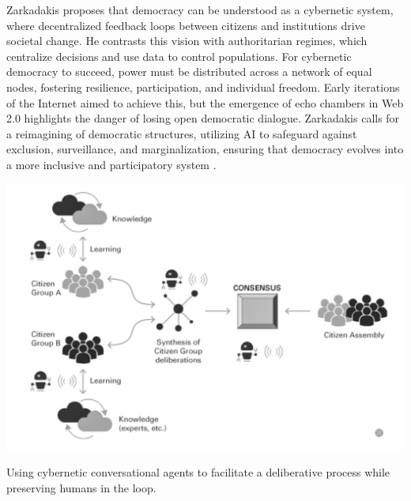 Zarkadakis proposes that democracy can be understood as a cybernetic system, where decentralized feedback loops between citizens and institutions drive societal change. He contrasts this vision with authoritarian regimes, which centralize decisions and use data to control populations. For cybernetic democracy to succeed, power must be distributed across a network of equal nodes, fostering resilience, participation, and individual freedom. Early iterations of the Internet aimed to achieve this, but the emergence of echo chambers in Web 2.0 highlights the danger of losing open democratic dialogue. Zarkadakis calls for a reimagining of democratic structures, utilizing AI to safeguard against exclusion, surveillance, and marginalization, ensuring that democracy evolves into a more inclusive and participatory system \parencite[25-27]{zarkadakes2020}.

\begin{marginfigure} \includegraphics[scale=0.2]{zarkadakis.png} \caption{Using cybernetic conversational agents to facilitate a deliberative process while preserving humans in the loop. \parencite[43]{zarkadakes2020}}\ \label{fig:zarkadakis} \end{marginfigure}

